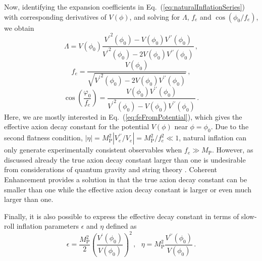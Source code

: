 \documentclass[11pt]{article}
\begin{document}
Now, identifying the expansion coefficients in Eq.~(\ref{eq:naturalInflationSeries}) with corresponding derivatives of $V\left(\phi\right)$, and solving for $\Lambda$, $f_e$ and $\cos\left(\phi_0 / f_e\right)$, we obtain
\begin{equation} \label{eq:lambdaFromPotential}
  \Lambda = V\left(\phi_0\right) \frac
    {{V^\prime}^2\left(\phi_0\right) - V\left(\phi_0\right) V^{\prime\prime}\left(\phi_0\right)}
    {{V^\prime}^2\left(\phi_0\right) - 2 V\left(\phi_0\right) V^{\prime\prime}\left(\phi_0\right)}
  \,,
\end{equation}
\begin{equation} \label{eq:feFromPotential}
  f_e = \frac
    {V\left(\phi_0\right)}
    {\sqrt{{V^\prime}^2\left(\phi_0\right)
      - 2 V\left(\phi_0\right) V^{\prime\prime}\left(\phi_0\right)}}\,,
\end{equation}
\begin{equation} \label{eq:fieldInitialFromPotential}
  \cos\left(\frac{\varphi_0}{f_e}\right) = \frac
    {V\left(\phi_0\right) V^{\prime\prime}\left(\phi_0\right)}
    {{V^\prime}^2\left(\phi_0\right) - V\left(\phi_0\right) V^{\prime\prime}\left(\phi_0\right)}\,.
\end{equation}
Here, we are mostly interested in Eq.~(\ref{eq:feFromPotential}), which gives the effective axion decay constant for the potential $V\left(\phi\right)$ near $\phi = \phi_0$.
Due to the second flatness condition, $\left|\eta\right| = M_\text{P}^2 \left|V_e^{\prime\prime} / V_e\right| = M_\text{P}^2 / f_e^2 \ll 1$, natural inflation can only generate experimentally consistent observables when $f_e \gg M_\text{P}$.
However, as discussed already the true axion decay constant larger than one is undesirable from considerations of quantum gravity and string theory \cite{Kallosh:1995hi, Banks:2003sx}.
Coherent Enhancement provides a solution in that the true axion decay constant can be smaller than one while the effective axion decay constant is larger or even much larger than one.

Finally, it is also possible to express the effective decay constant in terms of slow-roll inflation parameters $\epsilon$ and $\eta$ defined as
\begin{equation} \label{eq:epsEtaFromPotential}
  \epsilon =
    \frac{M_\text{P}^2}{2}
    \left(\frac{V^\prime\left(\phi_0\right)}{V\left(\phi_0\right)}\right)^2\,,
  ~~~ \eta = M_\text{P}^2 \frac{V^{\prime\prime}\left(\phi_0\right)}{V\left(\phi_0\right)}\,.
\end{equation}
\end{document}
